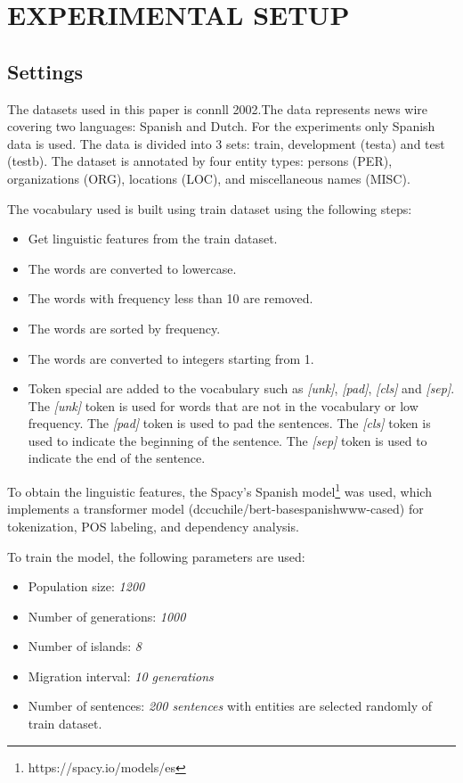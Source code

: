 \section{EXPERIMENTAL SETUP}

\subsection{Settings}

The datasets used in this paper is connll 2002\cite{tjong-kim-sang-2002-introduction}.The data represents news wire covering two languages: Spanish and Dutch. For the experiments only Spanish data is used. The data is divided into 3 sets: train, development (testa) and test (testb). The dataset is annotated by four entity types: persons (PER), organizations (ORG), locations (LOC), and miscellaneous names (MISC).

The vocabulary used is built using train dataset using the following steps:
\begin{itemize}
  \item Get linguistic features from the train dataset.
  \item The words are converted to lowercase.
  \item The words with frequency less than 10 are removed.
  \item The words are sorted by frequency.
  \item The words are converted to integers starting from 1.
  \item Token special are added to the vocabulary such as \textit{[unk]},  \textit{[pad]}, \textit{[cls]} and \textit{[sep]}. The \textit{[unk]} token is used for words that are not in the vocabulary or low frequency. The \textit{[pad]} token is used to pad the sentences. The \textit{[cls]} token is used to indicate the beginning of the sentence. The \textit{[sep]} token is used to indicate the end of the sentence.
\end{itemize}

To obtain the linguistic features, the Spacy's Spanish model\footnote{https://spacy.io/models/es} was used, which implements a transformer model (dccuchile/bert\--base\-spanish\-www\--cased) for tokenization, POS labeling, and dependency analysis.

To train the model, the following parameters are used:
\begin{itemize}
  \item Population size: \textit{1200}
  \item Number of generations: \textit{1000}
  \item Number of islands: \textit{8}
  \item Migration interval: \textit{10 generations}
  \item Number of sentences: \textit{200 sentences} with entities are selected randomly of train dataset.
\end{itemize}

